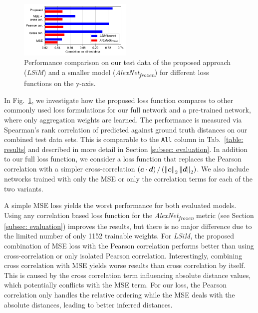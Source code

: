 \documentclass{article}
\begin{document}
\begin{figure}[ht]
    \centering
    \includegraphics[width=0.48\textwidth]{Images/CorrelationLoss}
    \vspace{-0.7cm}
    \caption{Performance comparison on our test data of the proposed approach (\textit{LSiM}) and a smaller model (\textit{AlexNet\textsubscript{frozen}}) for different loss functions on the y-axis.}
    \label{fig: correlation loss}
\end{figure}

In Fig.~\ref{fig: correlation loss}, we investigate how the proposed loss function compares to other commonly used loss formulations for our full network and a pre-trained network, where only aggregation weights are learned. The performance is measured via Spearman's rank correlation of predicted against ground truth distances on our combined test data sets. This is comparable to the \texttt{All} column in Tab.~\ref{table: results} and described in more detail in Section \ref{subsec: evaluation}. In addition to our full loss function, we consider a loss function that replaces the Pearson correlation with a simpler cross-correlation $({\bm{c}} \cdot {\bm{d}}) \,/\, (\left\|{\bm{c}}\right\|_2 \left\|{\bm{d}}\right\|_2)$. We also include networks trained with only the MSE or only the correlation terms for each of the two variants.

A simple MSE loss yields the worst performance for both evaluated models. Using any correlation based loss function for the \textit{AlexNet\textsubscript{frozen}} metric (see Section \ref{subsec: evaluation}) improves the results, but there is no major difference due to the limited number of only 1152 trainable weights. For \textit{LSiM}, the proposed combination of MSE loss with the Pearson correlation performs better than using cross-correlation or only isolated Pearson correlation.
Interestingly, combining cross correlation with MSE yields worse results than cross correlation by itself. 
This is caused by the cross correlation term influencing absolute distance values, which potentially conflicts with the MSE term.
For our loss, the Pearson correlation only handles the relative ordering while the MSE deals with the absolute distances, leading to better inferred distances.
\end{document}
